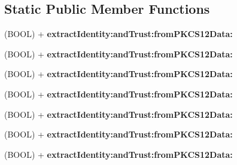 \subsection*{\-Static \-Public \-Member \-Functions}
\begin{DoxyCompactItemize}
\item 
\hypertarget{interface_client_certificate_tests_a790e447efd7270d8e1052c7ec6d68f33}{
(\-B\-O\-O\-L) + {\bfseries extract\-Identity\-:and\-Trust\-:from\-P\-K\-C\-S12\-Data\-:}}
\label{interface_client_certificate_tests_a790e447efd7270d8e1052c7ec6d68f33}

\item 
\hypertarget{interface_client_certificate_tests_a790e447efd7270d8e1052c7ec6d68f33}{
(\-B\-O\-O\-L) + {\bfseries extract\-Identity\-:and\-Trust\-:from\-P\-K\-C\-S12\-Data\-:}}
\label{interface_client_certificate_tests_a790e447efd7270d8e1052c7ec6d68f33}

\item 
\hypertarget{interface_client_certificate_tests_a790e447efd7270d8e1052c7ec6d68f33}{
(\-B\-O\-O\-L) + {\bfseries extract\-Identity\-:and\-Trust\-:from\-P\-K\-C\-S12\-Data\-:}}
\label{interface_client_certificate_tests_a790e447efd7270d8e1052c7ec6d68f33}

\item 
\hypertarget{interface_client_certificate_tests_a790e447efd7270d8e1052c7ec6d68f33}{
(\-B\-O\-O\-L) + {\bfseries extract\-Identity\-:and\-Trust\-:from\-P\-K\-C\-S12\-Data\-:}}
\label{interface_client_certificate_tests_a790e447efd7270d8e1052c7ec6d68f33}

\item 
\hypertarget{interface_client_certificate_tests_a790e447efd7270d8e1052c7ec6d68f33}{
(\-B\-O\-O\-L) + {\bfseries extract\-Identity\-:and\-Trust\-:from\-P\-K\-C\-S12\-Data\-:}}
\label{interface_client_certificate_tests_a790e447efd7270d8e1052c7ec6d68f33}

\item 
\hypertarget{interface_client_certificate_tests_a790e447efd7270d8e1052c7ec6d68f33}{
(\-B\-O\-O\-L) + {\bfseries extract\-Identity\-:and\-Trust\-:from\-P\-K\-C\-S12\-Data\-:}}
\label{interface_client_certificate_tests_a790e447efd7270d8e1052c7ec6d68f33}

\item 
\hypertarget{interface_client_certificate_tests_a790e447efd7270d8e1052c7ec6d68f33}{
(\-B\-O\-O\-L) + {\bfseries extract\-Identity\-:and\-Trust\-:from\-P\-K\-C\-S12\-Data\-:}}
\label{interface_client_certificate_tests_a790e447efd7270d8e1052c7ec6d68f33}


\end{DoxyCompactItemize}
